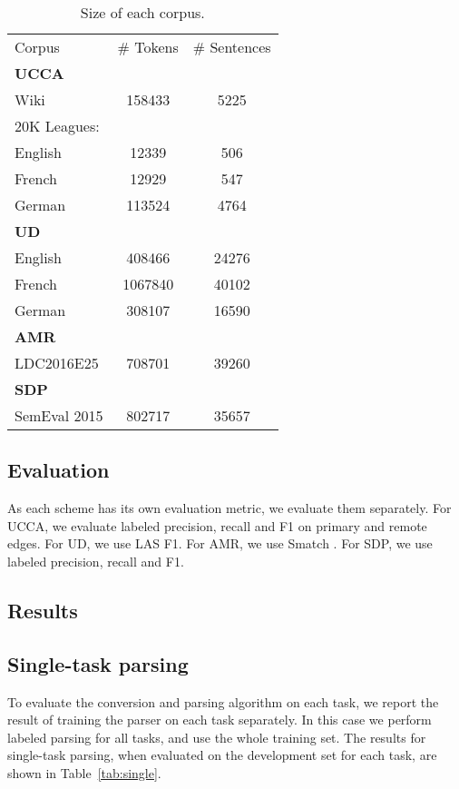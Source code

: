\documentclass[11pt,a4paper]{article}
\begin{document}
\begin{table}
\begin{tabular}{lcc}
Corpus & \# Tokens & \# Sentences \\
\textbf{UCCA} \\
Wiki & 158433 & 5225 \\
20K Leagues: \\
English & 12339 & 506 \\
French & 12929 & 547 \\
German & 113524 & 4764 \\
\textbf{UD} \\
English & 408466 & 24276 \\
French & 1067840 & 40102 \\
German & 308107 & 16590 \\
\textbf{AMR} \\
LDC2016E25 & 708701 & 39260 \\
\textbf{SDP} \\
SemEval 2015 & 802717 & 35657 \\
\end{tabular}
\caption{Size of each corpus.\label{tab:corpora}}
\end{table}


\subsection{Evaluation}\label{sec:evaluation}

As each scheme has its own evaluation metric, we evaluate them separately.
For UCCA, we evaluate labeled precision, recall and F1 on primary and remote edges.
For UD, we use LAS F1.
For AMR, we use Smatch \cite{cai2013smatch}.
For SDP, we use labeled precision, recall and F1.


\subsection{Results}\label{sec:results}




\subsection{Single-task parsing}\label{sec:results_single}

To evaluate the conversion and parsing algorithm on each task, we report the result
of training the parser on each task separately.
In this case we perform labeled parsing for all tasks, and use the whole training set.
The results for single-task parsing, when evaluated on the development set for each task,
are shown in Table~\ref{tab:single}.
\end{document}
